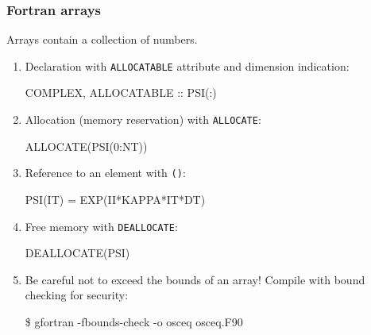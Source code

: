 \documentclass[aspectratio=43,9pt]{beamer}
\begin{document}
\begin{frame}
	\frametitle{Fortran arrays}
	Arrays contain a collection of numbers.
	\begin{enumerate}	
		\item Declaration with \texttt{ALLOCATABLE} attribute and dimension indication:
			\par\vspace*{1ex}\hspace*{.05\textwidth}\parbox{.8\textwidth}{\ttfamily\small
				COMPLEX, \textcolor{green!80!black}{ALLOCATABLE} :: PSI(:)
			}\vspace*{1ex}\par
		\item Allocation (memory reservation) with \texttt{ALLOCATE}:
			\par\vspace*{1ex}\hspace*{.05\textwidth}\parbox{.8\textwidth}{\ttfamily\small
				\textcolor{green!80!black}{ALLOCATE}(PSI(0:NT))
			}\vspace*{1ex}\par
		\item Reference to an element with \texttt{()}:
			\par\vspace*{1ex}\hspace*{.05\textwidth}\parbox{.8\textwidth}{\ttfamily\small
				PSI\textcolor{green!80!black}{(IT)} = EXP(II*KAPPA*IT*DT)
			}\vspace*{1ex}\par
		\item Free memory with \texttt{DEALLOCATE}:
			\par\vspace*{1ex}\hspace*{.05\textwidth}\parbox{.8\textwidth}{\ttfamily\small
				\textcolor{green!80!black}{DEALLOCATE}(PSI)
			}\vspace*{1ex}\par
		\item Be careful not to exceed the bounds of an array! Compile with bound checking for security:
			\par\vspace*{1ex}\hspace*{.05\textwidth}\parbox{.8\textwidth}{\ttfamily
				\$   gfortran -fbounds-check -o osceq osceq.F90
			}\vspace*{1ex}\par					
	\end{enumerate}
\end{frame}
\end{document}
